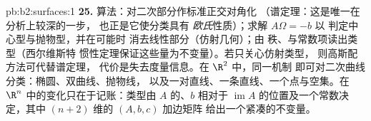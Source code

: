 \begin{solution}{pb:b2:surfaces:1}
\textbf{25.} 算法：对二次部分作标准正交对角化
（谱定理：这是唯一在分析上较深的一步，
也正是它使分类具有
\emph{欧氏}性质）；求解 $A\Omega = -b$ 以
判定中心型与抛物型，并在可能时
消去线性部分（仿射几何）；由
秩、与常数项读出类型（西尔维斯特
惯性定理保证这些量为不变量）。若只关心仿射类型，
则高斯配方法可代替谱定理，
代价是失去度量信息。在 $\R^2$ 中，同一机制
即可对二次曲线分类：椭圆、双曲线、抛物线，
以及一对直线、一条直线、一个点与空集。在 $\R^n$
中的变化只在于记账：类型由
$A$ 的、$b$ 相对于
$\operatorname{im}A$ 的位置及一个常数决定，其中
$(n{+}2)$ 维的 $(A, b, c)$ 加边矩阵
给出一个紧凑的不变量。
\end{solution}

